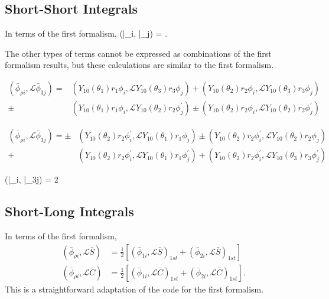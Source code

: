 \documentclass[Dissertation.tex]{subfiles}
\begin{document}
\subsection{Short-Short Integrals}
\label{sec:PWave2ndShortShort}
In terms of the first formalism,
\beq
\left(\bar{\phi}_{\rho i}, \bar{\phi}_{\rho j}\right) =  .
\eeq

The other types of terms cannot be expressed as combinations of the first formalism results, but these calculations are similar to the first formalism.

\begin{align}
\nonumber \left(\bar{\phi}_{\rho i},\mathcal{L} \bar{\phi}_{3j}\right) = &(Y_{10}(\theta_1) r_1 \phi_i, \mathcal{L} Y_{10}(\theta_3) r_3 \phi_j) + (Y_{10}(\theta_2) r_2 \phi_i, \mathcal{L} Y_{10}(\theta_3) r_3 \phi_j) \\
\pm &(Y_{10}(\theta_1) r_1 \phi_i, \mathcal{L} Y_{10}(\theta_2) r_2 \phi_j^\prime) \pm (Y_{10}(\theta_2) r_2 \phi_i, \mathcal{L} Y_{10}(\theta_2) r_2 \phi_j^\prime)
\end{align}

\begin{align}
\nonumber \left(\bar{\phi}_{\rho i},\mathcal{L} \bar{\phi}_{3j}\right) = \pm &(Y_{10}(\theta_2) r_2 \phi_i^\prime, \mathcal{L} Y_{10}(\theta_1) r_1 \phi_j) \pm (Y_{10}(\theta_2) r_2 \phi_i^\prime, \mathcal{L} Y_{10}(\theta_2) r_2 \phi_j) \\
+ &(Y_{10}(\theta_2) r_2 \phi_i^\prime, \mathcal{L} Y_{10}(\theta_1) r_1 \phi_j^\prime) + (Y_{10}(\theta_2) r_2 \phi_i^\prime, \mathcal{L} Y_{10}(\theta_3) r_3 \phi_j^\prime)
\end{align}

\beq
\nonumber \left(\bar{\phi}_{\rho i}, \bar{\phi}_{3j}\right) = 2 
\eeq

\subsection{Short-Long Integrals}
\label{sec:PWave2ndShortLong}
In terms of the first formalism,
\begin{subequations}
\begin{align}
\left(\bar{\phi}_{\rho i},\mathcal{L} \bar{S}\right) &= \frac{1}{2} \left[ \left(\bar{\phi}_{1i},\mathcal{L} \bar{S}\right)_{1st} + \left(\bar{\phi}_{2i},\mathcal{L} \bar{S}\right)_{1st} \right] \\
\left(\bar{\phi}_{\rho i},\mathcal{L} \bar{C}\right) &= \frac{1}{2} \left[ \left(\bar{\phi}_{1i},\mathcal{L} \bar{C}\right)_{1st} + \left(\bar{\phi}_{2i},\mathcal{L} \bar{C}\right)_{1st} \right].
\end{align}
\end{subequations}
This is a straightforward adaptation of the code for the first formalism.
\end{document}
